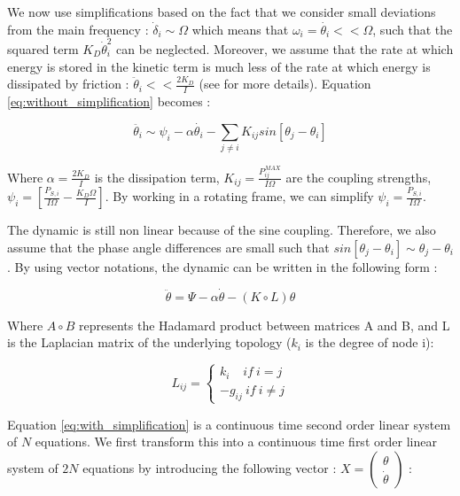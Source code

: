 \documentclass[conference]{IEEEtran}
\begin{document}
We now use simplifications based on the fact that we consider small deviations from the main frequency : $ \dot{ \delta}_i \sim \Omega $ which means that $ \omega_i = \dot{\theta_i} << \Omega $, such that the squared term $ K_D \dot{\theta}_i^2 $ can be neglected.
Moreover, we assume that the rate at which energy is stored in the kinetic term is much less of the rate at which energy is dissipated by friction : $ \ddot{ \theta }_i  << \frac{2 K_D}{I} $ (see \cite{Filatrella2008} for more details). Equation \ref{eq:without_simplification} becomes :

\begin{equation}
 \ddot{ \theta_i } \sim \psi_i - \alpha \dot{ \theta_i } - \sum_{j\neq i} K_{ij} sin \left[ \theta_j - \theta_i \right] 
\end{equation}

Where $ \alpha = \frac{2 K_D}{I} $ is the dissipation term, $ K_{ij} = \frac{P_{ij}^{MAX}}{I \Omega} $ are the coupling strengths, $ \psi_i = \left[ \frac{P_{S,i}}{I \Omega} - \frac{K_D \Omega}{I} \right] $. By working in a rotating frame, we can simplify $ \psi_i=\frac{P_{S,i}}{I \Omega} $.

The dynamic is still non linear because of the sine coupling. Therefore, we also assume that the phase angle differences are small such that $ sin \left[ \theta_j - \theta_i \right] \sim \theta_j - \theta_i $. By using vector notations, the dynamic can be written in the following form :

\begin{equation}
\label{eq:with_simplification}
\ddot{\theta} = \Psi - \alpha \dot{\theta} - (K \circ L)\theta
\end{equation}

Where $ A \circ B $ represents the Hadamard product between matrices A and B, and L is the Laplacian matrix of the underlying topology ($ k_i $ is the degree of node i):

\begin{equation}
L_{ij} = \left\{ \begin{array}{lll} k_i\ \ \ \ \,if\ i=j \\ -g_{ij}\  if\ i \neq j \end{array} \right. 
\end{equation}


Equation \ref{eq:with_simplification} is a continuous time second order linear system of $ N $ equations. We first transform this into a continuous time first order linear system of $ 2 N $ equations by introducing the following vector : $ X = \left( \begin{array}{c} \theta \\ \dot{\theta} \end{array} \right)$ : 
\end{document}
